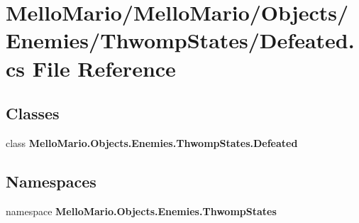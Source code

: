 \section{Mello\+Mario/\+Mello\+Mario/\+Objects/\+Enemies/\+Thwomp\+States/\+Defeated.cs File Reference}
\label{ThwompStates_2Defeated_8cs}
\subsection*{Classes}
\begin{DoxyCompactItemize}
\item 
class \textbf{ Mello\+Mario.\+Objects.\+Enemies.\+Thwomp\+States.\+Defeated}
\end{DoxyCompactItemize}
\subsection*{Namespaces}
\begin{DoxyCompactItemize}
\item 
namespace \textbf{ Mello\+Mario.\+Objects.\+Enemies.\+Thwomp\+States}
\end{DoxyCompactItemize}
